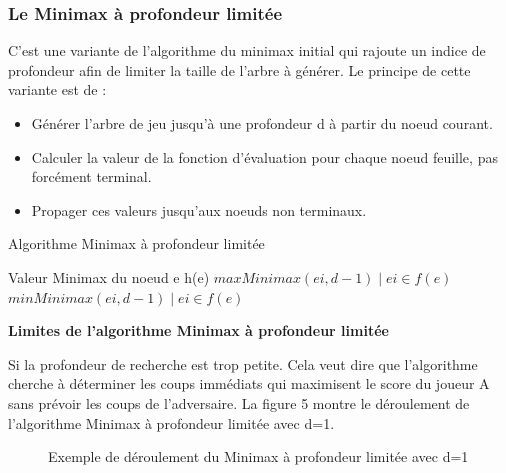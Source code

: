 \documentclass[11pt]{article}
\newcommand{\tmstrong}[1]{\textbf{#1}}
\newcommand{\tmtextit}[1]{{\itshape{#1}}}
\newenvironment{itemizedot}{\begin{itemize} \renewcommand{\labelitemi}{$\bullet$}\renewcommand{\labelitemii}{$\bullet$}\renewcommand{\labelitemiii}{$\bullet$}\renewcommand{\labelitemiv}{$\bullet$}}{\end{itemize}}
\newcommand{\algorithmicoutput}{\textbf{Sortie:}}
\newcommand{\Output}{\item[\algorithmicoutput]}
\begin{document}
\subsubsection{Le Minimax à profondeur limitée}

C'est une variante de l'algorithme du minimax initial qui rajoute un indice de
profondeur afin de limiter la taille de l'arbre à générer. Le
principe de cette variante est de :

\tmtextit{\begin{itemizedot}
  \item Générer l'arbre de jeu jusqu'à une profondeur d à
  partir du noeud courant.
  
  \item Calculer la valeur de la fonction d'évaluation pour chaque noeud
  feuille, pas forcément terminal.
  
  \item Propager ces valeurs jusqu'aux noeuds non terminaux.
\end{itemizedot}}

\begin{algorithm}
  \caption{Algorithme Minimax à profondeur limitée}

  \begin{algorithmic}
  	\Statex{}
  	\Output{Valeur Minimax du noeud e}
        \Return h(e)
      \Else
	      \Return $max{Minimax(ei, d-1) \mid ei \in f(e)}$
	    \Else 
	      \Return $min{Minimax(ei, d-1) \mid ei \in f(e)}$
	    \EndIf
	  \EndIf
    \EndFunction
  \end{algorithmic}
\end{algorithm}


{\tmstrong{Limites de l'algorithme Minimax à profondeur limitée}}

Si la profondeur de recherche est trop petite. Cela veut dire que l'algorithme cherche à déterminer les coups immédiats qui maximisent le score
du joueur A sans prévoir les coups de l'adversaire. La figure 5 montre le
déroulement de l'algorithme Minimax à profondeur limitée avec d=1.

\begin{figure}[h]
  \caption {Exemple de déroulement du Minimax à profondeur limitée avec d=1}
  \noindent{}
\end{figure}
\end{document}
